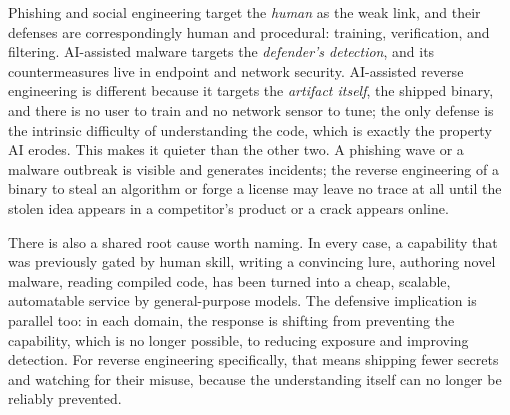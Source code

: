 \documentclass[conference]{IEEEtran}
\begin{document}
Phishing and social engineering target the \emph{human} as the weak link, and their
defenses are correspondingly human and procedural: training, verification, and
filtering. AI-assisted malware targets the \emph{defender's detection}, and its
countermeasures live in endpoint and network security. AI-assisted reverse
engineering is different because it targets the \emph{artifact itself}, the shipped
binary, and there is no user to train and no network sensor to tune; the only
defense is the intrinsic difficulty of understanding the code, which is exactly the
property AI erodes. This makes it quieter than the other two. A phishing wave or a
malware outbreak is visible and generates incidents; the reverse engineering of a
binary to steal an algorithm or forge a license may leave no trace at all until the
stolen idea appears in a competitor's product or a crack appears online.

There is also a shared root cause worth naming. In every case, a capability that was
previously gated by human skill, writing a convincing lure, authoring novel malware,
reading compiled code, has been turned into a cheap, scalable, automatable service by
general-purpose models. The defensive implication is parallel too: in each domain,
the response is shifting from preventing the capability, which is no longer possible,
to reducing exposure and improving detection. For reverse engineering specifically,
that means shipping fewer secrets and watching for their misuse, because the
understanding itself can no longer be reliably prevented.
\end{document}

